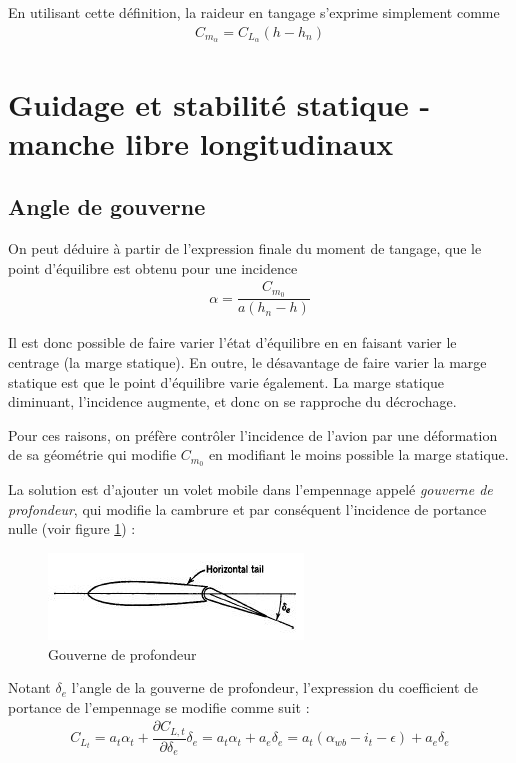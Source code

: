\documentclass{report}
\begin{document}
En utilisant cette définition, la raideur en tangage s'exprime simplement comme
\begin{eqnarray}
C_{m_\alpha}=C_{L_\alpha}(h-h_n)
\end{eqnarray}

\section{Guidage et stabilité statique - manche libre longitudinaux}

\subsection{Angle de gouverne}

On peut déduire à partir de l'expression finale du moment de tangage, que le point d'équilibre est obtenu pour une incidence 
\begin{eqnarray}
\alpha=\dfrac{C_{m_0}}{a(h_n-h)}
\end{eqnarray}

Il est donc possible de faire varier l'état d'équilibre en en faisant varier le centrage (la marge statique). En outre, le désavantage de faire varier la marge statique est que le point d'équilibre varie également. La marge statique diminuant, l'incidence augmente, et donc on se rapproche du décrochage.

Pour ces raisons, on préfère contrôler l'incidence de l'avion par une déformation de sa géométrie qui modifie $C_{m_0}$ en modifiant le moins possible la marge statique. 

La solution est d'ajouter un volet mobile dans l'empennage appelé \textit{gouverne de profondeur}, qui modifie la cambrure et par conséquent l'incidence de portance nulle (voir figure \ref{25}) :
\begin{figure}[h!]
    \centering
    \includegraphics{25.JPG}
    \caption{Gouverne de profondeur}
    \label{25}
\end{figure}

Notant $\delta_e$ l'angle de la gouverne de profondeur, l'expression du coefficient de portance de l'empennage se modifie comme suit :
\begin{eqnarray}
C_{L_t} = a_t\alpha_t+\dfrac{\partial C_{L,t}}{\partial\delta_e}\delta_e=a_t\alpha_t+a_e\delta_e=a_t(\alpha_{wb}-i_t-\epsilon)+a_e\delta_e
\end{eqnarray}
\end{document}
